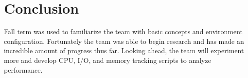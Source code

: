 \documentclass[10pt]{article}
\begin{document}
\section{Conclusion}
Fall term was used to familiarize the team with basic concepts and environment configuration. Fortunately the team was able to begin research and has made an incredible amount of progress thus far. Looking ahead, the team will experiment more and develop CPU, I/O, and memory tracking scripts to analyze performance.
\end{document}
